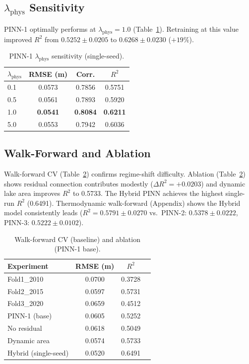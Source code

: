 \documentclass[conference,a4paper]{IEEEtran}
\begin{document}
\subsection{$\lambda_{\text{phys}}$ Sensitivity}

PINN-1 optimally performs at $\lambda_{\text{phys}}{=}1.0$ (Table~\ref{tab:lambda}). Retraining at this value improved $R^2$ from $0.5252{\pm}0.0205$ to $0.6268{\pm}0.0230$ ($+19\%$).

\begin{table}[htbp]
\centering
\caption{PINN-1 $\lambda_{\text{phys}}$ sensitivity (single-seed).}
\label{tab:lambda}
\begin{tabular}{lccc}
\toprule
$\lambda_{\text{phys}}$ & \textbf{RMSE (m)} & \textbf{Corr.} & \textbf{$R^2$} \\
\midrule
0.1 & 0.0573 & 0.7856 & 0.5751 \\
0.5 & 0.0561 & 0.7893 & 0.5920 \\
1.0 & \textbf{0.0541} & \textbf{0.8084} & \textbf{0.6211} \\
5.0 & 0.0553 & 0.7942 & 0.6036 \\
\bottomrule
\end{tabular}
\end{table}

\subsection{Walk-Forward and Ablation}

Walk-forward CV (Table~\ref{tab:wf}) confirms regime-shift difficulty. Ablation (Table~\ref{tab:wf}) shows residual connection contributes modestly ($\Delta R^2{=}{+}0.0203$) and dynamic lake area improves $R^2$ to 0.5733. The Hybrid PINN achieves the highest single-run $R^2$ (0.6491). Thermodynamic walk-forward (Appendix) shows the Hybrid model consistently leads ($R^2{=}0.5791{\pm}0.0270$ vs.~PINN-2: $0.5378{\pm}0.0222$, PINN-3: $0.5222{\pm}0.0102$).

\begin{table}[htbp]
\centering
\caption{Walk-forward CV (baseline) and ablation (PINN-1 base).}
\label{tab:wf}
\begin{tabular}{lccc}
\toprule
\textbf{Experiment} & \textbf{RMSE (m)} & \textbf{$R^2$} \\
\midrule
Fold1\_2010 & 0.0700 & 0.3728 \\
Fold2\_2015 & 0.0597 & 0.5731 \\
Fold3\_2020 & 0.0659 & 0.4512 \\
\midrule
PINN-1 (base)         & 0.0605 & 0.5252 \\
No residual           & 0.0618 & 0.5049 \\
Dynamic area          & 0.0574 & 0.5733 \\
Hybrid (single-seed)  & 0.0520 & 0.6491 \\
\bottomrule
\end{tabular}
\end{table}
\end{document}
